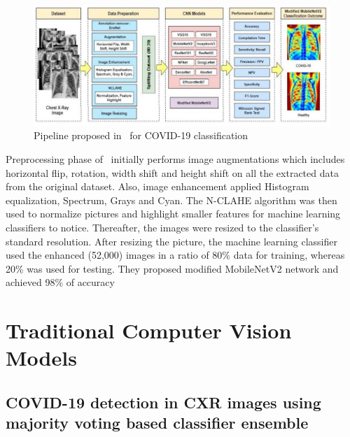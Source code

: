\begin{figure}
    \begin{center}
        \includegraphics[width=\textwidth]{Figures/AkterPipeline.png}
        \caption{\label{fig:akterPipeline} Pipeline proposed in~\cite{akt} for COVID-19 classification}
    \end{center}
\end{figure}

Preprocessing phase of~\cite{akt} initially performs image augmentations which includes horizontal flip, rotation, width shift and height shift on all the extracted data from the original dataset. Also, image enhancement applied Histogram equalization, Spectrum, Grays and Cyan. The N-CLAHE algorithm was then used to normalize pictures and highlight smaller features for machine learning classifiers to notice. Thereafter, the images were resized to the classifier’s standard resolution. After resizing the picture, the machine learning classifier used the enhanced (52,000) images in a ratio of 80\% data for training, whereas 20\% was used for testing. They proposed modified MobileNetV2 network and achieved 98\% of accuracy

\section{Traditional Computer Vision Models}
\subsection{ COVID-19 detection in CXR images using
majority voting based classifier ensemble}

